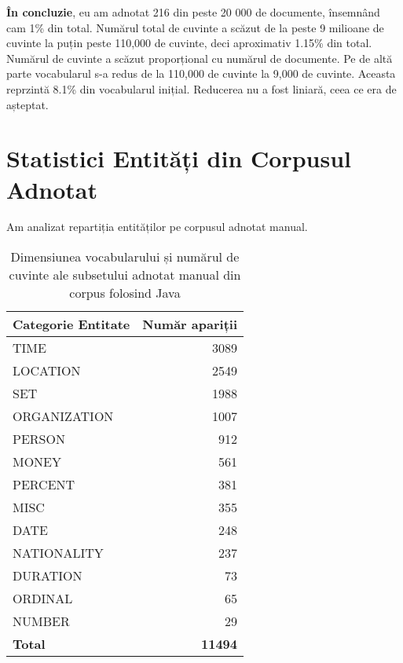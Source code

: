 \textbf{În concluzie}, eu am adnotat 216 din peste 20 000 de documente, însemnând cam 1\% din total. Numărul total de cuvinte a scăzut de la peste 9 milioane de cuvinte la puțin peste 110,000 de cuvinte, deci aproximativ 1.15\% din total. Numărul de cuvinte a scăzut proporțional cu numărul de documente. Pe de altă parte vocabularul s-a redus de la 110,000 de cuvinte la 9,000 de cuvinte. Aceasta reprzintă 8.1\% din vocabularul inițial. Reducerea nu a fost liniară, ceea ce era de așteptat.

\section{Statistici Entități din Corpusul Adnotat}

Am analizat repartiția entităților pe corpusul adnotat manual. 


\begin{center}
\begin{table}[htb]
  \caption{Dimensiunea vocabularului și numărul de cuvinte ale subsetului adnotat manual din corpus folosind Java}
  \begin{tabular}{|l|r|}
  \hline
   Categorie Entitate & Număr apariții\\
   \hline
   
   TIME	&	3089	\\
   LOCATION	&	2549	\\
   SET	&	1988	\\
   ORGANIZATION	&	1007	\\
   PERSON	&	912	\\
   MONEY	&	561	\\
   PERCENT	&	381	\\
   MISC	&	355	\\
   DATE	&	248	\\
   NATIONALITY	&	237	\\
   DURATION	&	73	\\
   ORDINAL	&	65	\\
   NUMBER	&	29	\\
   \hline
   \textbf{Total} 	&	\textbf{11494} \\
   \hline
   
  \end{tabular}
  \label{table:vocabulary-size-java-annotated}
\end{table}
\end{center}




